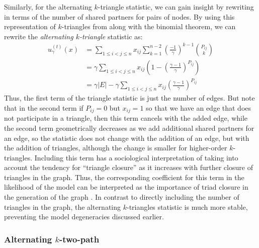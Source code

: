  Similarly, for the alternating $k$-triangle statistic, we can gain insight by rewriting in terms of the number of shared partners for pairs of nodes. By using this representation of $k$-triangles from  along with the binomial theorem, we can rewrite the \emph{alternating $k$-triangle} statistic as:
\begin{align}
 \label{eq:alternative-k-tri}
u_\gamma^{(t)}(x) & = \sum_{1 \leq i < j \leq n} x_{ij} \sum_{k = 1}^{n-2} \left(\frac{-1}{\gamma}\right)^{k-1}  \binom{P_{ij}}{k} \nonumber\\
& = \gamma \sum_{1 \leq i < j \leq n} x_{ij} \left(1 - \left(\frac{\gamma-1}{\gamma} \right)^{P_{ij}} \right) \nonumber\\
& = \gamma |E| - \gamma \sum_{1 \leq i < j \leq n} x_{ij} \left(\frac{\gamma-1}{\gamma} \right)^{P_{ij}}
\end{align}
Thus, the first term of the triangle statistic is just the number of edges. But note that in the second term if $P_{ij} = 0$ but $x_{ij} = 1$ so that we have an edge that does not participate in a triangle, then this term cancels with the added edge, while the second term geometrically decreases as we add additional shared partners for an edge, so the statistic does not change with the addition of an edge, but with the addition of triangles, although the change is smaller for higher-order $k$-triangles. Including this term has a sociological interpretation of taking into account the tendency for ``triangle closure'' as it increases with further closure of triangles in the graph. Thus, the corresponding coefficient for this term in the likelihood of the model can be interpreted as the importance of triad closure in the generation of the graph \cite{GKM09}. In contrast to directly including the number of triangles in the graph, the alternating $k$-triangles statistic is much more stable, preventing the model degeneracies discussed earlier. 

\subsubsection{Alternating $k$-two-path}

